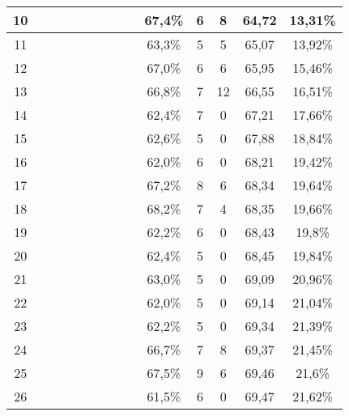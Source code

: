 \begin{longtable}{|c|c|c|c|c|c|c|c|c|c|c|c|c|c|}
10  &  \x    & \x    & \x    &       & \x\m  & \x    & \x\m  &       & 67,4\% &  6  & 8  & 64,72 & 13,31\% \\ \hline
11  &  \x    & \x    & \x    &       & \x    & \x    & \x\m  &       & 63,3\% &  5  & 5  & 65,07 & 13,92\% \\ \hline
12  &  \x    & \x    & \x    & \x    & \x\m  & \x\m  &       &       & 67,0\% &  6  & 6  & 65,95 & 15,46\% \\ \hline
13  &  \x    & \x    & \x    & \x    & \x\m  & \x\m  & \x\m  &       & 66,8\% &  7  & 12 & 66,55 & 16,51\% \\ \hline
14  &  \x    & \x    & \x    &       & \x    &       &       & \x\m  & 62,4\% &  7  & 0  & 67,21 & 17,66\% \\ \hline
15  &  \x    & \x    & \x    & \x    & \x    & \x    &       &       & 62,6\% &  5  & 0  & 67,88 & 18,84\% \\ \hline
16  &  \x    & \x    & \x    &       & \x    & \x    &       & \x    & 62,0\% &  6  & 0  & 68,21 & 19,42\% \\ \hline
17  &  \x    & \x    & \x    &       & \x\m  & \x\m  &       &       & 67,2\% &  8  & 6  & 68,34 & 19,64\% \\ \hline
18  &  \x    & \x    & \x    &       & \x\m  &       &       & \x\m  & 68,2\% &  7  & 4  & 68,35 & 19,66\% \\ \hline
19  &  \x    & \x    & \x    & \x    & \x    & \x    & \x    &       & 62,2\% &  6  & 0  & 68,43 & 19,8\% \\ \hline
20  &  \x    & \x    & \x    & \x    & \x    &       &       & \x\m  & 62,4\% &  5  & 0  & 68,45 & 19,84\% \\ \hline
21  &  \x    & \x    & \x    &       & \x    &       &       &       & 63,0\% &  5  & 0  & 69,09 & 20,96\% \\ \hline
22  &  \x    & \x    & \x    & \x    &       & \x    &       &       & 62,0\% &  5  & 0  & 69,14 & 21,04\% \\ \hline
23  &  \x    & \x    & \x    &       & \x    &       & \x    &       & 62,2\% &  5  & 0  & 69,34 & 21,39\% \\ \hline
24  &  \x    & \x    & \x    & \x    & \x\m  & \x    & \x    &       & 66,7\% &  7  & 8  & 69,37 & 21,45\% \\ \hline
25  &  \x    & \x    & \x    & \x    & \x\m  &       &       & \x\m  & 67,5\% &  9  & 6  & 69,46 & 21,6\% \\ \hline
26  &  \x    & \x    & \x    & \x    & \x    & \x\m  & \x    &       & 61,5\% &  6  & 0  & 69,47 & 21,62\% \\ \hline

\end{longtable}
